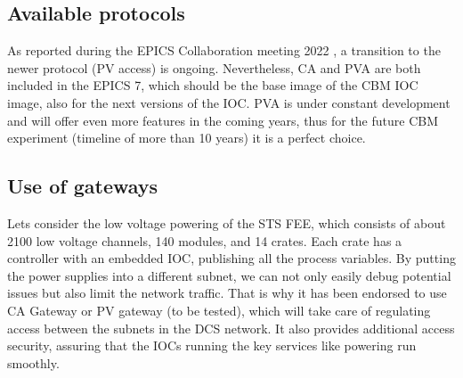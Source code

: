 \subsection{Available protocols}
As reported during the EPICS Collaboration meeting 2022 \cite{epics_2022}, a transition to the newer protocol (PV access) is ongoing. Nevertheless, CA and PVA are both included in the EPICS 7, which should be the base image of the CBM IOC image, also for the next versions of the IOC. PVA is under constant development and will offer even more features in the coming years, thus for the future CBM experiment (timeline of more than 10 years) it is a perfect choice. 

\subsection{Use of gateways}
Lets consider the low voltage powering of the \gls{STS} \gls{FEE}, which consists of about 2100 low voltage channels, 140 modules, and 14 crates. Each crate has a controller with an embedded \gls{IOC}, publishing all the process variables. By putting the power supplies into a different subnet, we can not only easily debug potential issues but also limit the network traffic. That is why it has been endorsed to use CA Gateway \cite{gateway} or PV gateway (to be tested), which will take care of regulating access between the subnets in the DCS network. It also provides additional access security, assuring that the \glspl{IOC} running the key services like powering run smoothly.

